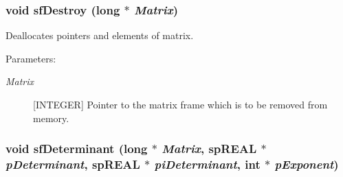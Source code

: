 \subsubsection{\setlength{\rightskip}{0pt plus 5cm}void sf\-Destroy (long $\ast$ {\em Matrix})}\label{spFortran_8c_a48}


Deallocates pointers and elements of matrix.\begin{Desc}
\item[Parameters: ]\par
\begin{description}
\item[{\em 
Matrix}][INTEGER] Pointer to the matrix frame which is to be removed from memory. \end{description}
\end{Desc}
\subsubsection{\setlength{\rightskip}{0pt plus 5cm}void sf\-Determinant (long $\ast$ {\em Matrix}, sp\-REAL $\ast$ {\em p\-Determinant}, sp\-REAL $\ast$ {\em pi\-Determinant}, int $\ast$ {\em p\-Exponent})}\label{spFortran_8c_a74}


